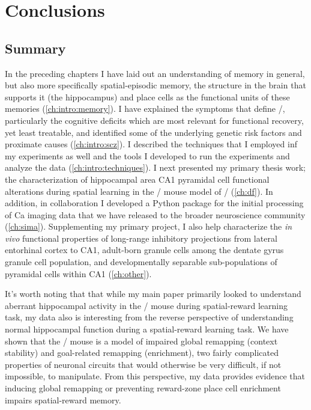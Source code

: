\acresetall
\chapter{Conclusions}
\label{ch:conclusions}

\section{Summary}
In the preceding chapters I have laid out an understanding of memory in general, but also more specifically spatial-episodic memory, the structure in the brain that supports it (the hippocampus) and place cells as the functional units of these memories (\autoref{ch:intro:memory}).
I have explained the symptoms that define \scz/, particularly the cognitive deficits which are most relevant for functional recovery, yet least treatable, and identified some of the underlying genetic risk factors and proximate causes (\autoref{ch:intro:scz}).
I described the techniques that I employed inf my experiments as well and the tools I developed to run the experiments and analyze the data (\autoref{ch:intro:techniques}).
I next presented my primary thesis work; the characterization of hippocampal area CA1 pyramidal cell functional alterations during spatial learning in the \df/ mouse model of \scz/ (\autoref{ch:df}).
In addition, in collaboration I developed a Python package for the initial processing of Ca imaging data that we have released to the broader neuroscience community (\autoref{ch:sima}).
Supplementing my primary project, I also help characterize the \emph{in vivo} functional properties of long-range inhibitory projections from lateral entorhinal cortex to CA1, adult-born granule cells among the dentate gyrus granule cell population, and developmentally separable sub-populations of pyramidal cells within CA1 (\autoref{ch:other}).

It's worth noting that that while my main paper primarily looked to understand aberrant hippocampal activity in the \df/ mouse during spatial-reward learning task, my data also is interesting from the reverse perspective of understanding normal hippocampal function during a spatial-reward learning task.
We have shown that the \df/ mouse is a model of impaired global remapping (context stability) and goal-related remapping (enrichment), two fairly complicated properties of neuronal circuits that would otherwise be very difficult, if not impossible, to manipulate.
From this perspective, my data provides evidence that inducing global remapping or preventing reward-zone place cell enrichment impairs spatial-reward memory.

